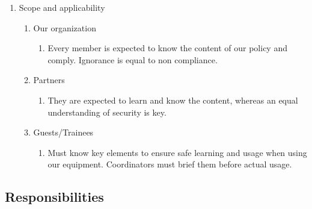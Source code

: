 \begin{enumerate}
  \item Scope and applicability
  \begin{enumerate}
    \item Our organization
      \begin{enumerate}
        \item Every member is expected to know the content of our policy and comply. Ignorance is equal to non compliance.
      \end{enumerate}
        \item Partners
      \begin{enumerate}
        \item They are expected to learn and know the content, whereas an equal understanding of security is key.
      \end{enumerate}
        \item Guests/Trainees
      \begin{enumerate}
        \item Must know key elements to ensure safe learning and usage when using our equipment. Coordinators must brief them before actual usage.
      \end{enumerate}
  \end{enumerate}
\end{enumerate}

\subsection{Responsibilities}

